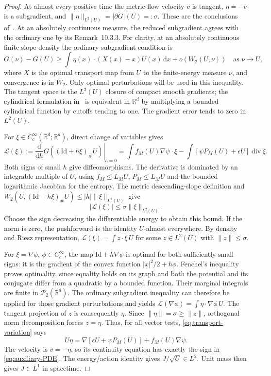 \documentclass[11pt]{article}
\numberwithin{equation}{section}
\theoremstyle{definition}
\theoremstyle{remark}
\newcommand{\R}{\mathbb R}
\newcommand{\Ptwo}{\mathcal P_2(\R^d)}
\newcommand{\dd}{\,\mathrm d}
\newcommand{\Div}{\operatorname{div}}
\newcommand{\norm}[1]{\lVert #1\rVert}
\begin{document}
\begin{proof}
At almost every positive time the metric-flow velocity $v$ is tangent,
$\eta=-v$ is a subgradient, and
$\norm{\eta}_{L^2(U)}=|\partial G|(U)=:\sigma$.
These are the conclusions of~\cite[Definition~11.1.1 and
Theorem~11.2.1]{AGS}. At an absolutely continuous measure, the reduced
subgradient agrees with the ordinary one by its Remark~10.3.3.
For clarity, at an absolutely continuous finite-slope density the ordinary
subgradient condition is~\cite[Definition~10.1.1, (10.1.3)]{AGS}
\[
 G(\nu)-G(U)\ge\int\eta(x)\cdot(X(x)-x)U(x)\dd x
                          +o(W_2(U,\nu))\quad\text{as }\nu\to U,
\]
where $X$ is the optimal transport map from $U$ to the finite-energy
measure $\nu$, and convergence is in $W_2$. Only optimal perturbations
will be used in this inequality.
The tangent space is the $L^2(U)$ closure of compact smooth gradients;
the cylindrical formulation in~\cite[Definition~8.4.1]{AGS} is equivalent
in $\R^d$ by multiplying a bounded cylindrical function by cutoffs tending
to one. The gradient error tends to zero in $L^2(U)$.

For $\xi\in C_c^\infty(\R^d;\R^d)$, direct change of variables gives
\begin{equation}\label{eq:transport-variation}
 \mathcal L(\xi):=\left.\frac{\mathrm d}{\mathrm dh}
       G((\mathrm{Id}+h\xi)_\#U)\right|_{h=0}
 =\int f_M(U)\nabla\psi\cdot\xi
        -\int[\psi P_M(U)+\epsilon U]\Div\xi.
\end{equation}
Both signs of small $h$ give diffeomorphisms. The derivative is dominated
by an integrable multiple of $U$, using $f_M\le L_MU$,
$P_M\le L_MU$ and the bounded logarithmic Jacobian for the entropy.
The metric descending-slope definition and
$W_2(U,(\mathrm{Id}+h\xi)_\#U)\le|h|\norm{\xi}_{L^2(U)}$ give
\[
 |\mathcal L(\xi)|\le\sigma\norm{\xi}_{L^2(U)}.
\]
Choose the sign decreasing the differentiable energy to obtain this bound.
If the norm is zero, the pushforward is the identity $U$-almost everywhere.
By density and Riesz representation,
$\mathcal L(\xi)=\int z\cdot\xi\,U$ for some
$z\in L^2(U)$ with $\norm z\le\sigma$.

For $\xi=\nabla\phi$, $\phi\in C_c^\infty$, the map
$\mathrm{Id}+h\nabla\phi$ is optimal for both sufficiently small signs:
it is the gradient of the convex function $|x|^2/2+h\phi$.
Fenchel's inequality proves optimality, since equality holds on its graph
and both the potential and its conjugate differ from a quadratic by a
bounded function. Their marginal integrals are finite in $\Ptwo$.
The ordinary subgradient inequality can therefore be applied for those
gradient perturbations and yields
$\mathcal L(\nabla\phi)=\int\eta\cdot\nabla\phi\,U$.
The tangent projection of $z$ is consequently $\eta$.
Since $\norm\eta=\sigma\ge\norm z$, orthogonal norm decomposition forces
$z=\eta$. Thus, for all vector tests, \eqref{eq:transport-variation} says
\[
 U\eta=\nabla[\epsilon U+\psi P_M(U)]+f_M(U)\nabla\psi.
\]
The velocity is $v=-\eta$, so its continuity equation has exactly the sign
in \eqref{eq:auxiliary-PDE}. The energy/action identity gives
$J/\sqrt U\in L^2$. Unit mass then gives $J\in L^1$ in spacetime.


\end{proof}
\end{document}
